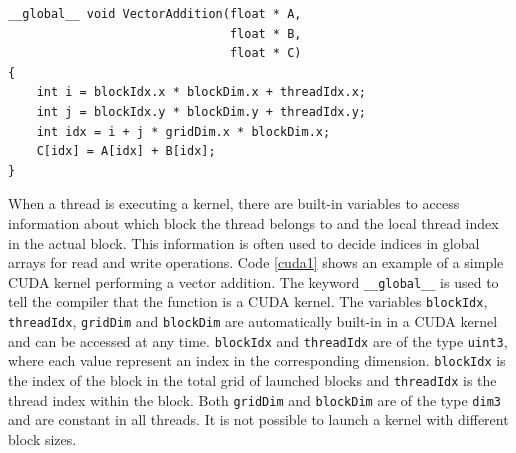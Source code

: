 \renewcommand{\lstlistingname}{Code}
\begin{lstlisting}[caption= Example of vector addition in CUDA, label=cuda1]
__global__ void VectorAddition(float * A, 
                               float * B, 
                               float * C)
{
    int i = blockIdx.x * blockDim.x + threadIdx.x;
    int j = blockIdx.y * blockDim.y + threadIdx.y;
    int idx = i + j * gridDim.x * blockDim.x;
    C[idx] = A[idx] + B[idx];
}
\end{lstlisting}

When a thread is executing a kernel, there are built-in variables to access information about which block the thread belongs to and the local thread index in the actual block. This information is often used to decide indices in global arrays for read and write operations. Code \ref{cuda1} shows an example of a simple CUDA kernel performing a vector addition. The keyword \texttt{\_\_global\_\_} is used to tell the compiler that the function is a CUDA kernel. The variables \texttt{blockIdx}, \texttt{threadIdx}, \texttt{gridDim} and \texttt{blockDim} are automatically built-in in a CUDA kernel and can be accessed at any time. \texttt{blockIdx} and \texttt{threadIdx} are of the type \texttt{uint3}, where each value represent an index in the corresponding dimension. \texttt{blockIdx} is the index of the block in the total grid of launched blocks and \texttt{threadIdx} is the thread index within the block. Both \texttt{gridDim} and \texttt{blockDim} are of the type \texttt{dim3} and are constant in all threads. It is not possible to launch a kernel with different block sizes.

